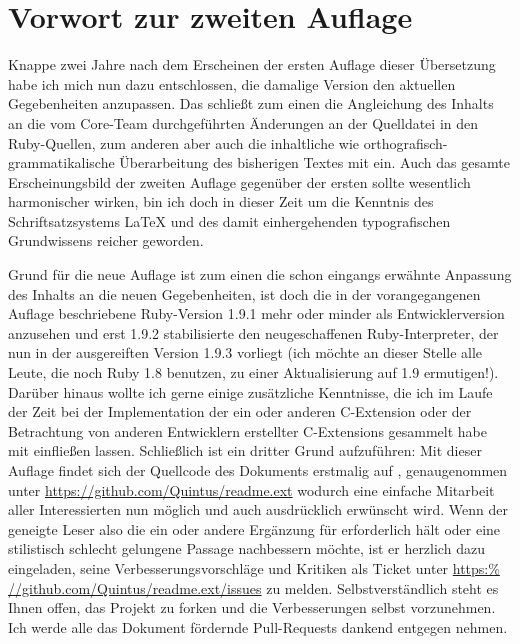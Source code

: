 \section*{Vorwort zur zweiten Auflage}
\label{sec:vorwort2}

Knappe zwei Jahre nach dem Erscheinen der ersten Auflage dieser
Übersetzung habe ich mich nun dazu entschlossen, die damalige Version
den aktuellen Gegebenheiten anzupassen. Das schließt zum einen die
Angleichung des Inhalts an die vom Core-Team durchgeführten Änderungen
an der Quelldatei  in den Ruby-Quellen, zum anderen
aber auch die inhaltliche wie orthografisch-grammatikalische
Überarbeitung des bisherigen Textes mit ein. Auch das gesamte
Erscheinungsbild der zweiten Auflage gegenüber der ersten sollte
wesentlich harmonischer wirken, bin ich doch in dieser Zeit um die
Kenntnis des Schriftsatzsystems \LaTeX{} und des damit einhergehenden
typografischen Grundwissens reicher geworden.

Grund für die neue Auflage ist zum einen die schon eingangs erwähnte
Anpassung des Inhalts an die neuen Gegebenheiten, ist doch die in der
vorangegangenen Auflage beschriebene Ruby-Version 1.9.1 mehr oder
minder als Entwicklerversion anzusehen und erst 1.9.2
stabilisierte den neugeschaffenen Ruby-Interpreter, der nun in der
ausgereiften Version 1.9.3 vorliegt (ich möchte an dieser Stelle alle
Leute, die noch Ruby 1.8 benutzen, zu einer Aktualisierung auf 1.9
ermutigen!). Darüber hinaus wollte ich gerne einige zusätzliche
Kenntnisse, die ich im Laufe der Zeit bei der Implementation der ein
oder anderen C-Extension oder der Betrachtung von anderen Entwicklern
erstellter C-Extensions gesammelt habe mit einfließen
lassen. Schließlich ist ein dritter Grund aufzuführen: Mit dieser
Auflage findet sich der Quellcode des Dokuments erstmalig auf
, genaugenommen unter \url{https://github.com/Quintus/readme.ext}
wodurch eine einfache Mitarbeit aller Interessierten nun möglich und auch
ausdrücklich erwünscht wird. Wenn der geneigte Leser also die ein oder
andere Ergänzung für erforderlich hält oder eine stilistisch schlecht
gelungene Passage nachbessern möchte, ist er herzlich dazu eingeladen,
seine Verbesserungsvorschläge und Kritiken als Ticket unter \url{https:%
//github.com/Quintus/readme.ext/issues} zu melden. Selbstverständlich
steht es Ihnen offen, das Projekt zu forken und die Verbesserungen selbst
vorzunehmen. Ich werde alle das Dokument fördernde Pull-Requests dankend
entgegen nehmen.

